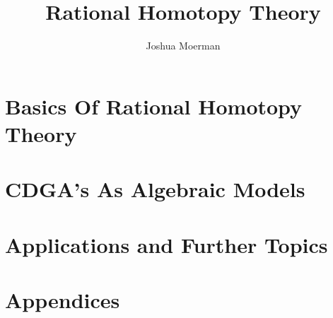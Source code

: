 \documentclass[a4paper,12pt,footinclude=true,headinclude=true,oneside,dottedtoc]{scrbook}
\title{Rational Homotopy Theory}
\author{Joshua Moerman}
\begin{document}

\maketitle



\part{Basics Of Rational Homotopy Theory}


\part{CDGA's As Algebraic Models}


\part{Applications and Further Topics}


\appendix
\part{Appendices}


\listoftodos



\end{document}
